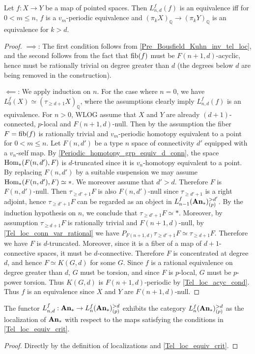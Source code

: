 	\begin{thm}\label{Tel_loc_equiv_crit}
		Let $f:X\to Y$ be a map of pointed spaces. Then $L_{n,d}^f(f)$ is an equivalence iff for $0<m\leq n$, $f$ is a $v_m$-periodic equivalence and $(\pi_kX)_\mathbb{Q}\to(\pi_kY)_\mathbb{Q}$ is an equivalence for $k>d$. 
	\end{thm}
	\begin{proof}
		$\implies$: The first condition follows from \cref{Pre_Bousfield_Kuhn_inv_tel_loc}, and the second follows from the fact that $\operatorname{\mathrm{fib}}(f)$ must be $F(n+1,d)$-acyclic, hence must be rationally trivial on degree greater than $d$ (the degrees below $d$ are being removed in the construction). 

		$\impliedby$: We apply induction on $n$. For the case where $n=0$, we have $L_0^f(X)\simeq(\tau_{\geq d+1}X)_\mathbb{Q}$, where the assumptions clearly imply $L_{n,d}^f(f)$ is an equivalence. For $n>0$, WLOG assume that $X$ and $Y$ are already $(d+1)$-connected, $p$-local and $F(n+1,d)$-null. Then by the assumption the fiber $F=\operatorname{\mathrm{fib}}(f)$ is rationally trivial and $v_m$-periodic homotopy equivalent to a point for $0<m\leq n$. Let $F(n,d')$ be a type $n$ space of connectivity $d'$ equipped with a $v_n$-self map. By \cref{Periodic_homotopy_grp_equiv_d_conn}, the space $\operatorname{\mathrm{Hom}}_*(F(n,d'),F)$ is $d$-truncated since it is $v_n$-homotopy equivalent to a point. By replacing $F(n,d')$ by a suitable suspension we may assume $\operatorname{\mathrm{Hom}}_*(F(n,d'),F)\simeq*$. We moreover assume that $d'>d$. Therefore $F$ is $F(n,d')$-null. Then $\tau_{\geq d'+1}F$ is also $F(n,d')$-null since $\tau_{\geq d'+1}$ is a right adjoint, hence $\tau_{\geq d'+1}F$ can be regarded as an object in $L_{n-1}^f(\mathbf{An}_*)_{(p)}^{>d'}$. By the induction hypothesis on $n$, we conclude that $\tau_{\geq d'+1}F\simeq*$. Moreover, by assumption $\tau_{\geq d+1}F$ is rationally trivial and $F(n+1,d)$-null, by \cref{Tel_loc_conn_var_rational} we have $P_{F(n+1,d)}\tau_{\geq d'+1}F\simeq\tau_{\geq d+1}F$. Therefore we have $F$ is $d$-truncated. Moreover, since it is a fiber of a map of $d+1$-connective spaces, it must be $d$-connective. Therefore $F$ is concentrated at degree $d$, and hence $F\simeq K(G,d)$ for some $G$. Since $f$ is a rational equivalence on degree greater than $d$, $G$ must be torsion, and since $F$ is $p$-local, $G$ must be $p$-power torsion. Thus $K(G,d)$ is $F(n+1,d)$-periodic by \cref{Tel_loc_acyc_cond}. Thus $f$ is an equivalence since $X$ and $Y$ are $F(n+1,d)$-null. 
	\end{proof}

	\begin{coro}\label{Tel_loc_equiv_maps}
		The functor $L_{n,d}^f:\mathbf{An}_*\to L_n^f(\mathbf{An}_*)_{(p)}^{>d}$ exhibits the category $L_n^f(\mathbf{An}_*)_{(p)}^{>d}$ as the localization of $\mathbf{An}_*$ with respect to the maps satisfying the conditions in \cref{Tel_loc_equiv_crit}. 
	\end{coro}
	\begin{proof}
		Directly by the definition of localizations and \cref{Tel_loc_equiv_crit}. 
	\end{proof}

